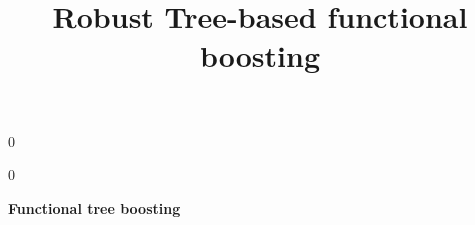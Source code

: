 \documentclass[authoryear,12pt]{article}
\newcommand{\blind}{0}
\begin{document}


\def\spacingset#1{\renewcommand{\baselinestretch}%
{#1}\small\normalsize} \spacingset{1}



\blind
{
  \title{\bf Robust Tree-based functional boosting}
  \maketitle
} \fi

\blind
{
  \bigskip
  \bigskip
  \bigskip
  \begin{center}
    {\LARGE\bf Functional tree boosting}
\end{center}
  \medskip
} \fi


\spacingset{1.5} %







\end{document}
